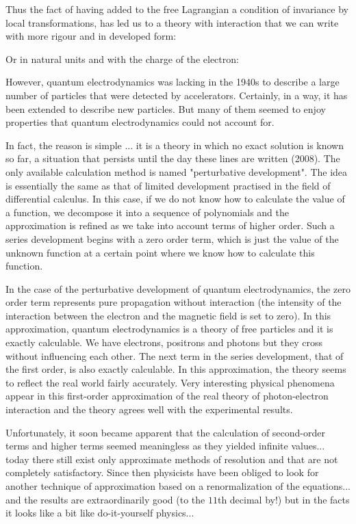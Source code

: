 	Thus the fact of having added to the free Lagrangian a condition of invariance by local transformations, has led us to a theory with interaction that we can write with more rigour and in developed form:
	
	Or in natural units and with the charge of the electron:
	
	However, quantum electrodynamics was lacking in the 1940s to describe a large number of particles that were detected by accelerators. Certainly, in a way, it has been extended to describe new particles. But many of them seemed to enjoy properties that quantum electrodynamics could not account for.

	In fact, the reason is simple ... it is a theory in which no exact solution is known so far, a situation that persists until the day these lines are written (2008). The only available calculation method is named "perturbative development". The idea is essentially the same as that of limited development practised in the field of differential calculus. In this case, if we do not know how to calculate the value of a function, we decompose it into a sequence of polynomials and the approximation is refined as we take into account terms of higher order. Such a series development begins with a zero order term, which is just the value of the unknown function at a certain point where we know how to calculate this function.
	
	In the case of the perturbative development of quantum electrodynamics, the zero order term represents pure propagation without interaction (the intensity of the interaction between the electron and the magnetic field is set to zero). In this approximation, quantum electrodynamics is a theory of free particles and it is exactly calculable. We have electrons, positrons and photons but they cross without influencing each other. The next term in the series development, that of the first order, is also exactly calculable. In this approximation, the theory seems to reflect the real world fairly accurately. Very interesting physical phenomena appear in this first-order approximation of the real theory of photon-electron interaction and the theory agrees well with the experimental results.

	Unfortunately, it soon became apparent that the calculation of second-order terms and higher terms seemed meaningless as they yielded infinite values... today there still exist only approximate methods of resolution and that are not completely satisfactory. Since then physicists have been obliged to look for another technique of approximation based on a renormalization of the equations... and the results are extraordinarily good (to the $11$th decimal by!) but in the facts it looks like a bit like do-it-yourself physics...
	
